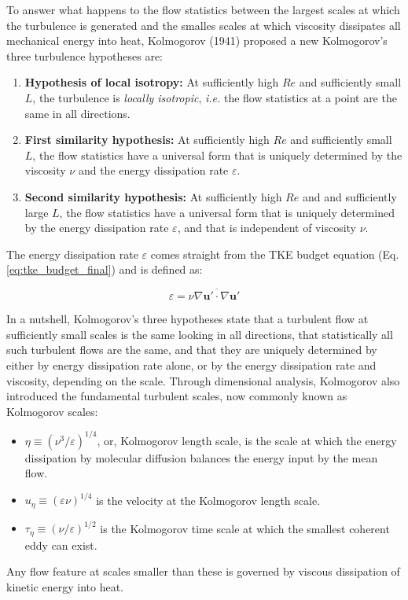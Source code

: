 \documentclass[12pt]{article}
\numberwithin{equation}{section}
\numberwithin{figure}{section}
\numberwithin{table}{section}
\begin{document}
To answer what happens to the flow statistics between the largest scales at
which the turbulence is generated and the smalles scales at which viscosity
dissipates all mechanical energy into heat, Kolmogorov (1941) proposed a new
Kolmogorov's three turbulence hypotheses are: 

\begin{enumerate}
  \item \textbf{Hypothesis of local isotropy:} At sufficiently high $Re$ and
  sufficiently small $L$, the turbulence is \textit{locally isotropic},
  \textit{i.e.} the flow statistics at a point are the same in all directions.
  \item \textbf{First similarity hypothesis:} At sufficiently high $Re$ and
  sufficiently small $L$, the flow statistics have a universal form
  that is uniquely determined by the viscosity $\nu$ and the energy dissipation 
  rate $\varepsilon$.
  \item \textbf{Second similarity hypothesis:} At sufficiently high $Re$ and
  and sufficiently large $L$, the flow statistics have a universal form
  that is uniquely determined by the energy dissipation rate $\varepsilon$,
  and that is independent of viscosity $\nu$.
\end{enumerate}
The energy dissipation rate $\varepsilon$ comes straight from the TKE budget
equation (Eq. \ref{eq:tke_budget_final}) and is defined as:

\begin{equation}
  \varepsilon = \nu \overline{\nabla \mathbf{u}' \cdot \nabla \mathbf{u}'}
\end{equation}

In a nutshell, Kolmogorov's three hypotheses state that a turbulent flow at
sufficiently small scales is the same looking in all directions, that
statistically all such turbulent flows are the same, and that they are uniquely
determined by either by energy dissipation rate alone, or by the energy
dissipation rate and viscosity, depending on the scale.
Through dimensional analysis, Kolmogorov also introduced the fundamental
turbulent scales, now commonly known as Kolmogorov scales:

\begin{itemize}
  \item $\eta \equiv \left( \nu^3/\varepsilon \right)^{1/4}$, or,
  Kolmogorov length scale, is the scale at which the energy dissipation by
  molecular diffusion balances the energy input by the mean flow.
  \item $u_\eta \equiv \left( \varepsilon \nu \right)^{1/4}$ is
  the velocity at the Kolmogorov length scale.
  \item $\tau_\eta \equiv \left( \nu/\varepsilon \right)^{1/2}$ is the
  Kolmogorov time scale at which the smallest coherent eddy can exist.
\end{itemize}
Any flow feature at scales smaller than these is governed by viscous dissipation
of kinetic energy into heat.
\end{document}
